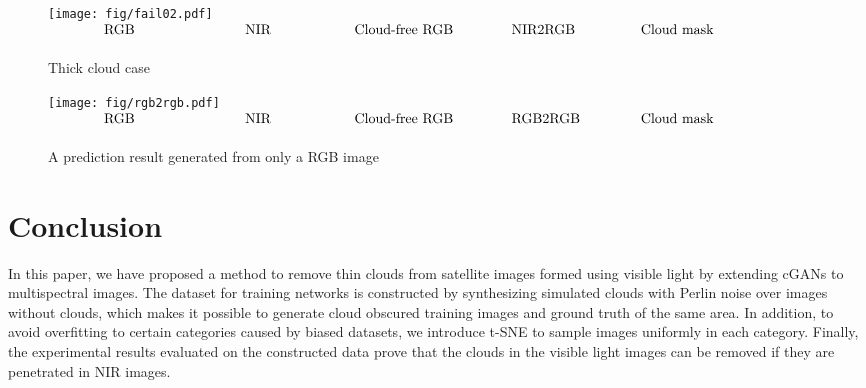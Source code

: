 \documentclass[10pt,twocolumn,letterpaper]{article}
\begin{document}
\begin{figure*}[h!]
\begin{center}
\hspace*{0mm}\texttt{[image: fig/fail02.pdf]}
\vspace{-2mm}
$\begin{array}{p{32mm}p{32mm}p{32mm}p{32mm}p{32mm}}
 \hspace*{12mm}\raisebox{1mm}{RGB}
&\hspace*{12mm}\raisebox{1mm}{NIR}
&\hspace*{4mm}\raisebox{1mm}{Cloud-free RGB}
&\hspace*{8mm}\raisebox{1mm}{NIR2RGB}
&\hspace*{5mm}\raisebox{1mm}{Cloud mask}
\end{array}$
\caption{Thick cloud case}
\label{fig:fail02}
\vspace{-3mm}
\end{center}
\end{figure*}

\begin{figure*}[h!]
\begin{center}
\hspace*{0mm}\texttt{[image: fig/rgb2rgb.pdf]}
\vspace{-2mm}
$\begin{array}{p{32mm}p{32mm}p{32mm}p{32mm}p{32mm}}
 \hspace*{12mm}\raisebox{1mm}{RGB}
&\hspace*{12mm}\raisebox{1mm}{NIR}
&\hspace*{4mm}\raisebox{1mm}{Cloud-free RGB}
&\hspace*{8mm}\raisebox{1mm}{RGB2RGB}
&\hspace*{5mm}\raisebox{1mm}{Cloud mask}
\end{array}$
\caption{A prediction result generated from only a RGB image}
\label{fig:rgb2rgb}
\vspace{-3mm}
\end{center}
\end{figure*}



\section{Conclusion}
In this paper, we have proposed a method to remove thin clouds from satellite images formed using visible light by extending cGANs to multispectral images. 
The dataset for training networks is constructed by synthesizing simulated clouds with Perlin noise over images without clouds, which makes it possible to generate cloud obscured training images and ground truth of the same area.  
In addition, to avoid overfitting to certain categories caused by biased datasets, we introduce t-SNE to sample images uniformly in each category. 
Finally, the experimental results evaluated on the constructed data prove that the clouds in the visible light images can be removed if they are penetrated in NIR images.
\end{document}
